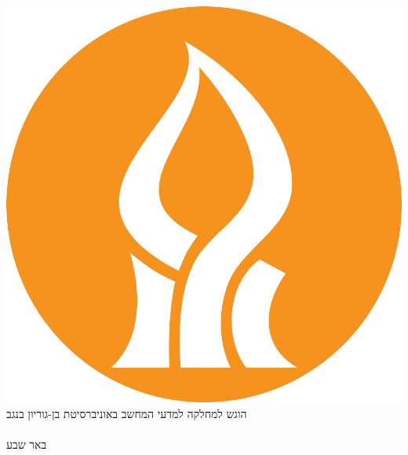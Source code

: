 \documentclass[12pt,a4paper,\pagelayoutformat,onecolumn]{book}
\newcommand\blankPageWithoutFooter{
\newpage
\mbox{}
\thispagestyle{empty} %
\newpage
}
\begin{document}
\begin{center}
\includegraphics[scale=0.4]{../01Cover/Images/logoBGU}\\
\vspace{9mm}
{\large הוגש למחלקה למדעי המחשב באוניברסיטת בן-גוריון בנגב
}\\
\vspace{5em}
{\large 
    \makeatletter
    \def\@FormatForHebrew#1#2#3{%
    \HebrewMonthName{#2}{#3}~%
    \HebrewYearName{#3}}
    \makeatother
    \textsc{\hebrewdate{\submitday}{\submitmonth}{\submityear}}
}\\
\vspace{2em}
{\large\textsc{באר שבע}}
\end{center}
\thispagestyle{empty} %
\cleardoublepage




\pagestyle{plain}


% 

\cleardoublepage
\end{document}
